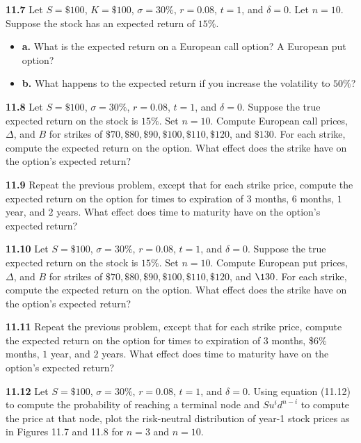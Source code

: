 \documentclass[
  letterpaper,
  DIV=11,
  numbers=noendperiod]{scrartcl}
\begin{document}
\textbf{11.7} Let \(S = \$100\), \(K = \$100\), \(\sigma = 30\%\),
\(r = 0.08\), \(t = 1\), and \(\delta = 0\). Let \(n = 10\). Suppose the
stock has an expected return of \(15\%\).

\begin{itemize}
\item
  \textbf{a.} What is the expected return on a European call option? A
  European put option?
\item
  \textbf{b.} What happens to the expected return if you increase the
  volatility to \(50\%\)?
\end{itemize}

\textbf{11.8} Let \(S = \$100\), \(\sigma = 30\%\), \(r = 0.08\),
\(t = 1\), and \(\delta = 0\). Suppose the true expected return on the
stock is \(15\%\). Set \(n = 10\). Compute European call prices,
\(\Delta\), and \(B\) for strikes of
\(\$70, \$80, \$90, \$100, \$110, \$120\), and \(\$130\). For each
strike, compute the expected return on the option. What effect does the
strike have on the option's expected return?

\textbf{11.9} Repeat the previous problem, except that for each strike
price, compute the expected return on the option for times to expiration
of \(3\) months, \(6\) months, \(1\) year, and \(2\) years. What effect
does time to maturity have on the option's expected return?

\textbf{11.10} Let \(S = \$100\), \(\sigma = 30\%\), \(r = 0.08\),
\(t = 1\), and \(\delta = 0\). Suppose the true expected return on the
stock is \(15\%\). Set \(n = 10\). Compute European put prices,
\(\Delta\), and \(B\) for strikes of
\(\$70, \$80, \$90, \$100, \$110, \$120\), and \(\130\). For each
strike, compute the expected return on the option. What effect does the
strike have on the option's expected return?

\textbf{11.11} Repeat the previous problem, except that for each strike
price, compute the expected return on the option for times to expiration
of \(3\) months, \$6\% months, \(1\) year, and \(2\) years. What effect
does time to maturity have on the option's expected return?

\textbf{11.12} Let \(S = \$100\), \(\sigma = 30\%\), \(r = 0.08\),
\(t = 1\), and \(\delta = 0\). Using equation (11.12) to compute the
probability of reaching a terminal node and \(Su^{i}d^{n-i}\) to compute
the price at that node, plot the risk-neutral distribution of year-1
stock prices as in Figures 11.7 and 11.8 for \(n = 3\) and \(n = 10\).
\end{document}

